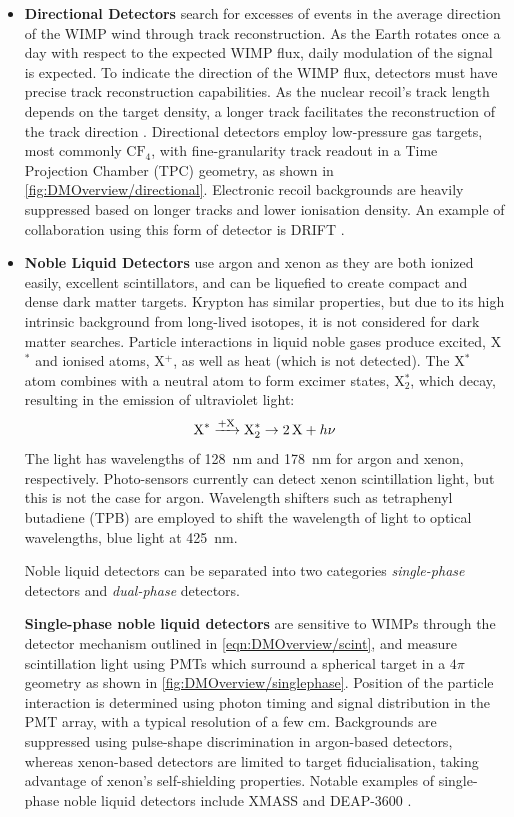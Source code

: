 \begin{itemize}
    \item \textbf{Directional Detectors} search for excesses of events in the average direction of the WIMP wind through track reconstruction. As the Earth rotates once a day with respect to the expected WIMP flux, daily modulation of the signal is expected. To indicate the direction of the WIMP flux, detectors must have precise track reconstruction capabilities. As the nuclear recoil’s track length depends on the target density, a longer track facilitates the reconstruction of the track direction \cite{Schumann:2019eaa}. Directional detectors employ low-pressure gas targets, most commonly $\text{CF}_4$, with fine-granularity track readout in a Time Projection Chamber (TPC) geometry, as shown in \autoref{fig:DMOverview/directional}. Electronic recoil backgrounds are heavily suppressed based on longer tracks and lower ionisation density. An example of collaboration using this form of detector is DRIFT \cite{BATTAT201765}.

    \item \textbf{Noble Liquid Detectors} use argon and xenon as they are both ionized easily, excellent scintillators, and can be liquefied to create compact and dense dark matter targets. Krypton has similar properties, but due to its high intrinsic background from long-lived isotopes, it is not considered for dark matter searches. Particle interactions in liquid noble gases produce excited, X$^*$ and ionised atoms, X$^+$, as well as heat (which is not detected). The X$^*$ atom combines with a neutral atom to form excimer states, X$^*_2$, which decay, resulting in the emission of ultraviolet light:
    \begin{equation}\label{eqn:DMOverview/scint}
        \textnormal{X}^*  \xrightarrow{+\textnormal{X}} \textnormal{X}^*_2 \rightarrow 2\, \textnormal{X} + h \nu
    \end{equation}
    The light has wavelengths of 128~nm and 178~nm for argon and xenon, respectively. Photo-sensors currently can detect xenon scintillation light, but this is not the case for argon. Wavelength shifters such as tetraphenyl butadiene (TPB) are employed to shift the wavelength of light to optical wavelengths, blue light at 425~nm. 
    
    Noble liquid detectors can be separated into two categories \textit{single-phase} detectors and \textit{dual-phase} detectors.

    \textbf{Single-phase noble liquid detectors} are sensitive to WIMPs through the detector mechanism outlined in \autoref{eqn:DMOverview/scint}, and measure scintillation light using PMTs which surround a spherical target in a $4\pi$ geometry as shown in \autoref{fig:DMOverview/singlephase}. Position of the particle interaction is determined using photon timing and signal distribution in the PMT array, with a typical resolution of a few cm. Backgrounds are suppressed using pulse-shape discrimination in argon-based detectors, whereas xenon-based detectors are limited to target fiducialisation, taking advantage of xenon's self-shielding properties. Notable examples of single-phase noble liquid detectors include XMASS \cite{Abe:2013tc} and DEAP-3600 \cite{DEAP-3600:2024szw}.


\end{itemize}
